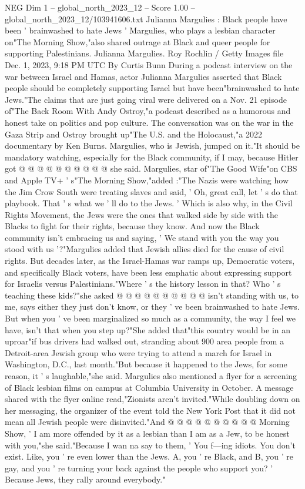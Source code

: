 \begin{textsample}{NEG Dim 1 – global\_north\_2023\_12 – Score 1.00 – global\_north\_2023\_12/103941606.txt}  \label{ex:f1_neg_362}
Julianna Margulies : Black people have been ' brainwashed to hate Jews ' Margulies, who plays a lesbian character on"The Morning Show,"also shared outrage at Black and queer people for supporting Palestinians.
Julianna Margulies.
Roy Rochlin / Getty Images file Dec. 1, 2023, 9:18 PM UTC By Curtis Bunn During a podcast interview on the war between Israel and Hamas, actor Julianna Margulies asserted that Black people should be completely supporting Israel but have been"brainwashed to hate Jews."The claims that are just going viral were delivered on a Nov. 21 episode of"The Back Room With Andy Ostroy,"a podcast described as a humorous and honest take on politics and pop culture.
The conversation was on the war in the Gaza Strip and Ostroy brought up"The U.S. and the Holocaust,"a 2022 documentary by Ken Burns.
Margulies, who is Jewish, jumped on it."It should be mandatory watching, especially for the Black community, if I may, because Hitler got @ @ @ @ @ @ @ @ @ @ she said.
Margulies, star of"The Good Wife"on CBS and Apple TV+ ' s"The Morning Show,"added :"The Nazis were watching how the Jim Crow South were treating slaves and said, ' Oh, great call, let ' s do that playbook.
That ' s what we ' ll do to the Jews. ' Which is also why, in the Civil Rights Movement, the Jews were the ones that walked side by side with the Blacks to fight for their rights, because they know.
And now the Black community isn't embracing us and saying, ' We stand with you the way you stood with us '?"Margulies added that Jewish allies died for the cause of civil rights.
But decades later, as the Israel-Hamas war ramps up, Democratic voters, and specifically Black voters, have been less emphatic about expressing support for Israelis versus Palestinians."Where ' s the history lesson in that?
Who ' s teaching these kids?"she asked @ @ @ @ @ @ @ @ @ @ isn't standing with us, to me, says either they just don't know, or they ' ve been brainwashed to hate Jews.
But when you ' ve been marginalized so much as a community, the way I feel we have, isn't that when you step up?"She added that"this country would be in an uproar"if bus drivers had walked out, stranding about 900 area people from a Detroit-area Jewish group who were trying to attend a march for Israel in Washington, D.C., last month."But because it happened to the Jews, for some reason, it ' s laughable,"she said.
Margulies also mentioned a flyer for a screening of Black lesbian films on campus at Columbia University in October.
A message shared with the flyer online read,"Zionists aren't invited."While doubling down on her messaging, the organizer of the event told the New York Post that it did not mean all Jewish people were disinvited."And @ @ @ @ @ @ @ @ @ @ Morning Show, ' I am more offended by it as a lesbian than I am as a Jew, to be honest with you,"she said."Because I wan na say to them, ' You f---ing idiots.
You don't exist.
Like, you ' re even lower than the Jews.
A, you ' re Black, and B, you ' re gay, and you ' re turning your back against the people who support you? ' Because Jews, they rally around everybody."

\end{textsample}
